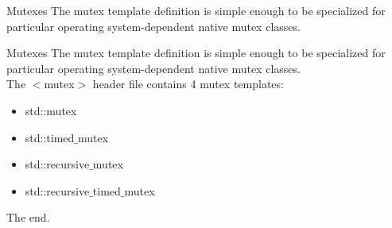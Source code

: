 \documentclass[aspectratio=169,xcolor=dvipsnames]{beamer}
\begin{document}
\begin{frame}{Mutexes}
The mutex template definition is simple enough to be specialized for particular operating system-dependent native mutex classes.\\
\end{frame}
\begin{frame}{Mutexes}
The mutex template definition is simple enough to be specialized for particular operating system-dependent native mutex classes.\\
The $<$mutex$>$ header file contains 4 mutex templates:
\begin{itemize}
    \item std::mutex
    \item std::timed$\_$mutex
    \item std::recursive$\_$mutex
    \item std::recursive$\_$timed$\_$mutex
\end{itemize}
\end{frame}
\begin{frame}
\begin{center}
    \huge The end.
\end{center}
\end{frame}
\end{document}
